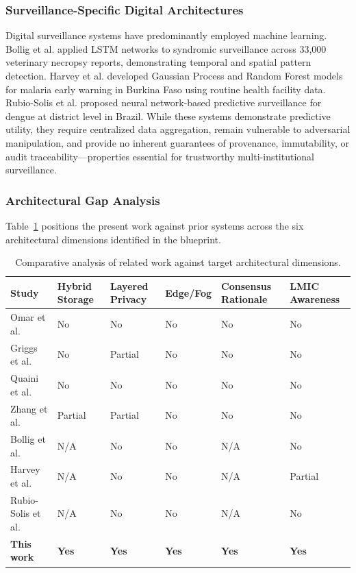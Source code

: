 \subsubsection{Surveillance-Specific Digital Architectures}

Digital surveillance systems have predominantly employed machine learning. Bollig et al.\cite{bollig2020machine} applied LSTM networks to syndromic surveillance across 33,000 veterinary necropsy reports, demonstrating temporal and spatial pattern detection. Harvey et al.\cite{harvey2021predicting} developed Gaussian Process and Random Forest models for malaria early warning in Burkina Faso using routine health facility data. Rubio-Solis et al.\cite{rubiosolis2019zika} proposed neural network-based predictive surveillance for dengue at district level in Brazil. While these systems demonstrate predictive utility, they require centralized data aggregation, remain vulnerable to adversarial manipulation, and provide no inherent guarantees of provenance, immutability, or audit traceability---properties essential for trustworthy multi-institutional surveillance.

\subsubsection{Architectural Gap Analysis}

Table~\ref{tab:related} positions the present work against prior systems across the six architectural dimensions identified in the blueprint.

\begin{table}[!ht]
\caption{Comparative analysis of related work against target architectural dimensions.}\label{tab:related}
\begin{tabular*}{\textwidth}{@{\extracolsep\fill}llllll@{}}
\toprule
Study & Hybrid Storage & Layered Privacy & Edge/Fog & Consensus Rationale & LMIC Awareness \\
\midrule
Omar et al.\cite{omar2019privacy} & No & No & No & No & No \\
Griggs et al.\cite{griggs2018healthcare} & No & Partial & No & No & No \\
Quaini et al.\cite{quaini2018model} & No & No & No & No & No \\
Zhang et al.\cite{zhang2018fhirchain} & Partial & Partial & No & No & No \\
Bollig et al.\cite{bollig2020machine} & N/A & No & No & N/A & No \\
Harvey et al.\cite{harvey2021predicting} & N/A & No & No & N/A & Partial \\
Rubio-Solis et al.\cite{rubiosolis2019zika} & N/A & No & No & N/A & No \\
\textbf{This work} & \textbf{Yes} & \textbf{Yes} & \textbf{Yes} & \textbf{Yes} & \textbf{Yes} \\
\bottomrule
\end{tabular*}
\end{table}

